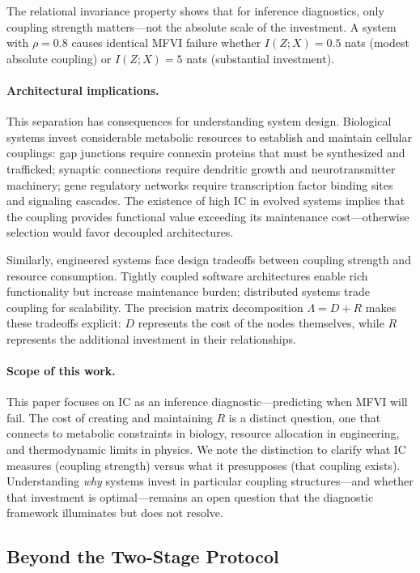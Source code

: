 \documentclass[10pt]{article} %
\theoremstyle{plain}
\theoremstyle{definition}
\begin{document}
\noindent The relational invariance property shows that for inference diagnostics, only coupling strength matters---not the absolute scale of the investment. A system with $\rho = 0.8$ causes identical MFVI failure whether $I(Z;X) = 0.5$ nats (modest absolute coupling) or $I(Z;X) = 5$ nats (substantial investment).

\paragraph{Architectural implications.} This separation has consequences for understanding system design. Biological systems invest considerable metabolic resources to establish and maintain cellular couplings: gap junctions require connexin proteins that must be synthesized and trafficked; synaptic connections require dendritic growth and neurotransmitter machinery; gene regulatory networks require transcription factor binding sites and signaling cascades. The existence of high IC in evolved systems implies that the coupling provides functional value exceeding its maintenance cost---otherwise selection would favor decoupled architectures.

Similarly, engineered systems face design tradeoffs between coupling strength and resource consumption. Tightly coupled software architectures enable rich functionality but increase maintenance burden; distributed systems trade coupling for scalability. The precision matrix decomposition $\Lambda = D + R$ makes these tradeoffs explicit: $D$ represents the cost of the nodes themselves, while $R$ represents the additional investment in their relationships.

\paragraph{Scope of this work.} This paper focuses on IC as an inference diagnostic---predicting when MFVI will fail. The cost of creating and maintaining $R$ is a distinct question, one that connects to metabolic constraints in biology, resource allocation in engineering, and thermodynamic limits in physics. We note the distinction to clarify what IC measures (coupling strength) versus what it presupposes (that coupling exists). Understanding \emph{why} systems invest in particular coupling structures---and whether that investment is optimal---remains an open question that the diagnostic framework illuminates but does not resolve.

\subsection{Beyond the Two-Stage Protocol}
\label{sec:higher_order}
\end{document}
